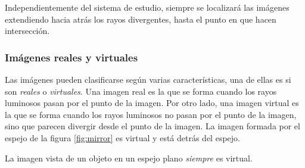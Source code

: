 \begin{tcolorbox}[myconclusion]
    Independientemente del sistema de estudio, siempre se localizará las imágenes extendiendo hacia atrás los rayos divergentes, hasta el punto en que hacen intersección.
\end{tcolorbox}


\subsubsection{Imágenes reales y virtuales}

Las imágenes pueden clasificarse según varias características, una de ellas es si son \textit{reales} o \textit{virtuales}. Una imagen real es la que se forma cuando los rayos luminosos pasan por el punto de la imagen. Por otro lado, una imagen virtual es la que se forma cuando los rayos luminosos no pasan por el punto de la imagen, sino que parecen divergir desde el punto de la imagen. La imagen formada por el espejo de la figura \ref{fig:mirror} es virtual y está detrás del espejo.

La imagen vista de un objeto en un espejo plano \textit{siempre} es virtual.